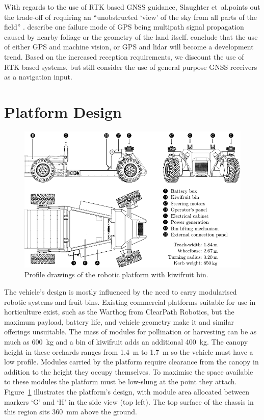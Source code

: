\documentclass[preprint,authoryear,12pt]{elsarticle}
\begin{document}
        With regards to the use of RTK based GNSS guidance, Slaughter et~al.\@ points out the trade-off of requiring an ``unobstructed `view' of the sky from all parts of the field'' \citep{Slaughter2008}.
        \cite{Durrant-Whyte2005} describe one failure mode of GPS being multipath signal propagation caused by nearby foliage or the geometry of the land itself.
        \cite{Li2009} conclude that the use of either GPS and machine vision, or GPS and lidar will become a development trend.
        Based on the increased reception requirements, we discount the use of RTK based systems, but still consider the use of general purpose GNSS receivers as a navigation input.

\section{Platform Design}
\label{sect:design}
        \begin{figure}[htb]
            \centering
            \includegraphics[width=\linewidth]{imgs/profile_views/AMMP-All-Labelled.pdf}
            \caption{Profile drawings of the robotic platform with kiwifruit bin.}
            \label{fig:AMMP}
        \end{figure}

        The vehicle's design is mostly influenced by the need to carry modularised robotic systems and fruit bins.
        Existing commercial platforms suitable for use in horticulture exist, such as the Warthog from ClearPath Robotics, but the maximum payload, battery life, and vehicle geometry make it and similar offerings unsuitable.
        The mass of modules for pollination or harvesting can be as much as \SI{600}{\kilo\gram} and a bin of kiwifruit adds an additional \SI{400}{\kilo\gram}.
        The canopy height in these orchards ranges from \SI{1.4}{\meter} to \SI{1.7}{\meter} so the vehicle must have a low profile.
        Modules carried by the platform require clearance from the canopy in addition to the height they occupy themselves.
        To maximise the space available to these modules the platform must be low-slung at the point they attach.
        Figure~\ref{fig:AMMP} illustrates the platform's design, with module area allocated between markers `G' and `H' in the side view (top left).
        The top surface of the chassis in this region sits \SI{360}{\milli\meter} above the ground.
\end{document}
